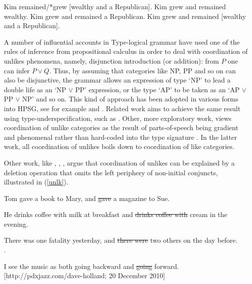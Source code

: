 \documentclass[output=paper]{langsci/langscibook}
\begin{document}
\begin{exe}
\ex
\begin{xlista}
\ex Kim remained/*grew [wealthy and a Republican].
\ex Kim grew and remained wealthy.
\ex{*} Kim grew and remained a Republican.
\ex{*} Kim grew and remained [wealthy and a Republican].
\end{xlista}\label{show2}
\end{exe}



A number of influential accounts in Type-logical grammar
\citep{morrill90,morrill94,bayer} have used one of the rules of
inference from propositional calculus in order to deal with
coordination of unlikes phenomena, namely, disjunction introduction
(or addition): from $P$ one can infer $P \vee Q$. 
Thus, by assuming that categories like NP, PP
and so on can also be disjunctive, the grammar allows an expression
of type `NP' to lead a double life as an `NP $\vee$ PP' expression,
or the type `AP' to be taken as an `AP $\vee$ PP $\vee$ NP' and so
on. This kind of approach has been adopted in various forms into HPSG, see for example \citet{Daniels02} and  \citet{Yatabe:04}.
Related work aims to achieve the same result using type-underspecification, such as 
 \citet{sag}. Other, more exploratory work, views coordination of unlike categories as the result of   parts-of-speech being gradient and  phenomenal rather than hard-coded into the type signature  \citep{bookivan}. In the latter work, all coordination 
 of unlikes boils down to coordination of like categories.
 

Other work, like
 \citet{berthold0}, \citet{yatabe},  \citet{Beavers},
 \citet{chaves06}  argue that
coordination of unlikes can be explained by
a deletion operation that omits the left periphery of
non-initial conjuncts, illustrated in   (\ref{unlk}).


\begin{exe}
\ex
\begin{xlista}
\ex Tom gave a book to Mary, and \sout{gave} a magazine to Sue. 

\ex He drinks coffee with milk at breakfast and \sout{drinks coffee with} cream in the evening.\\ \citep{hudson84}

\ex There was one fatality yesterday, and \sout{there were} two others on the day
before.\\
\citep[339]{chavesthesis}.

\ex I see the music as both going backward and \sout{going} forward.\\
{\small [http://pdxjazz.com/dave-holland; 20 December 2010]}
\end{xlista}\label{unlk}
\end{exe}
\end{document}
